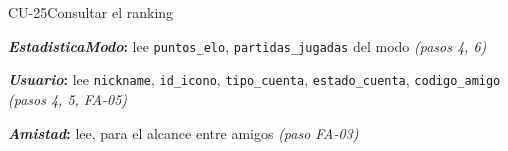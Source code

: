 \begin{fichacu}{CU-25}{Consultar el ranking}
{\begin{cudatos}
      \item \textbf{\textit{EstadisticaModo}:} lee \texttt{puntos\_\allowbreak{}elo}, \texttt{partidas\_\allowbreak{}jugadas} del modo \textit{(pasos 4, 6)}
      \item \textbf{\textit{Usuario}:} lee \texttt{nickname}, \texttt{id\_\allowbreak{}icono}, \texttt{tipo\_\allowbreak{}cuenta}, \texttt{estado\_\allowbreak{}cuenta}, \texttt{codigo\_\allowbreak{}amigo} \textit{(pasos 4, 5, \mbox{FA-05})}
      \item \textbf{\textit{Amistad}:} lee, para el alcance entre amigos \textit{(paso \mbox{FA-03})}
    \end{cudatos}} \\ \hline
\end{fichacu}
\clearpage
